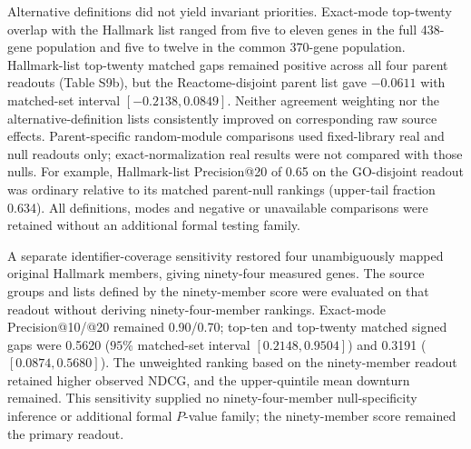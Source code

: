 \documentclass[a4paper,fleqn]{cas-sc}
\makeatletter
\DeclareRobustCommand{\rev}[1]{{\color{red}\def\@citecolor{black}\def\@linkcolor{red}\def\@urlcolor{red}#1}}
\makeatother
\begin{document}
\rev{Alternative definitions did not yield invariant priorities.} \rev{Exact-mode top-twenty overlap with the Hallmark list ranged from five to eleven genes in the full 438-gene population and five to twelve in the common 370-gene population.} \rev{Hallmark-list top-twenty matched gaps remained positive across all four parent readouts (Table S9b), but the Reactome-disjoint parent list gave $-0.0611$ with matched-set interval $[-0.2138,0.0849]$.} \rev{Neither agreement weighting nor the alternative-definition lists consistently improved on corresponding raw source effects.} \rev{Parent-specific random-module comparisons used fixed-library real and null readouts only; exact-normalization real results were not compared with those nulls.} \rev{For example, Hallmark-list Precision@20 of 0.65 on the GO-disjoint readout was ordinary relative to its matched parent-null rankings (upper-tail fraction 0.634).} \rev{All definitions, modes and negative or unavailable comparisons were retained without an additional formal testing family.}

\rev{A separate identifier-coverage sensitivity restored four unambiguously mapped original Hallmark members, giving ninety-four measured genes.} \rev{The source groups and lists defined by the ninety-member score were evaluated on that readout without deriving ninety-four-member rankings.} \rev{Exact-mode Precision@10/@20 remained 0.90/0.70; top-ten and top-twenty matched signed gaps were 0.5620 ($95\%$ matched-set interval $[0.2148,0.9504]$) and 0.3191 ($[0.0874,0.5680]$).} \rev{The unweighted ranking based on the ninety-member readout retained higher observed NDCG, and the upper-quintile mean downturn remained.} \rev{This sensitivity supplied no ninety-four-member null-specificity inference or additional formal $P$-value family; the ninety-member score remained the primary readout.}
\end{document}
